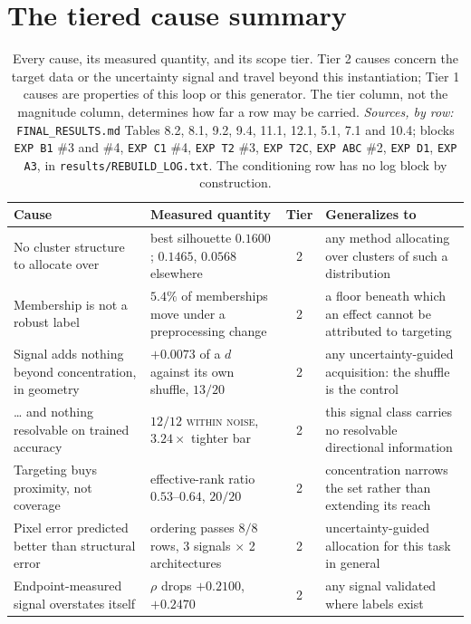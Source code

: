 \documentclass{article} %
\begin{document}
\section{The tiered cause summary}
\label{app:causes}

\begin{table}[t]
\caption{Every cause, its measured quantity, and its scope tier. Tier 2 causes concern the target
data or the uncertainty signal and travel beyond this instantiation; Tier 1 causes are properties of
this loop or this generator. The tier column, not the magnitude column, determines how far a row may
be carried. \emph{Sources, by row:} \texttt{FINAL\_RESULTS.md} Tables 8.2, 8.1, 9.2, 9.4, 11.1, 12.1,
5.1, 7.1 and 10.4; blocks \texttt{EXP B1} \#3 and \#4, \texttt{EXP C1} \#4, \texttt{EXP T2} \#3,
\texttt{EXP T2C}, \texttt{EXP ABC} \#2, \texttt{EXP D1}, \texttt{EXP A3}, in
\texttt{results/REBUILD\_LOG.txt}. The conditioning row has no log block by construction.}
\label{tab:causes}
\begin{center}
\small
\begin{tabular}{p{3.1cm}p{4.0cm}cp{3.6cm}}
\toprule
Cause & Measured quantity & Tier & Generalizes to \\
\midrule
No cluster structure to allocate over & best silhouette $0.1600$; $0.1465$, $0.0568$ elsewhere & 2 & any method allocating over clusters of such a distribution \\
Membership is not a robust label & $5.4\%$ of memberships move under a preprocessing change & 2 & a floor beneath which an effect cannot be attributed to targeting \\
Signal adds nothing beyond concentration, in geometry & $+0.0073$ of a $d$ against its own shuffle, $13/20$ & 2 & any uncertainty-guided acquisition: the shuffle is the control \\
\ldots{} and nothing resolvable on trained accuracy & $12/12$ \textsc{within noise}, $3.24\times$ tighter bar & 2 & this signal class carries no resolvable directional information \\
Targeting buys proximity, not coverage & effective-rank ratio $0.53$--$0.64$, $20/20$ & 2 & concentration narrows the set rather than extending its reach \\
Pixel error predicted better than structural error & ordering passes $8/8$ rows, 3 signals $\times$ 2 architectures & 2 & uncertainty-guided allocation for this task in general \\
Endpoint-measured signal overstates itself & $\rho$ drops $+0.2100$, $+0.2470$ & 2 & any signal validated where labels exist \\

\end{tabular}
\end{center}
\end{table}
\end{document}
